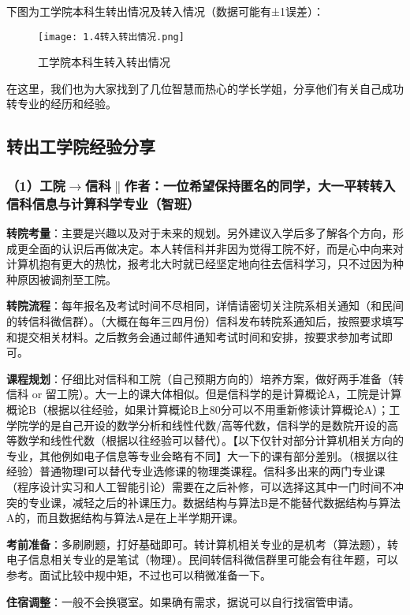\documentclass[11pt,oneside]{book}
\begin{document}
下图为工学院本科生转出情况及转入情况（数据可能有±1误差）：
\begin{figure}[htbp]
    \centering
    \texttt{[image: 1.4转入转出情况.png]}
    \renewcommand{\figurename}{图}
    \caption{工学院本科生转入转出情况}
    \label{fig:enter-label}
\end{figure}

在这里，我们也为大家找到了几位智慧而热心的学长学姐，分享他们有关自己成功转专业的经历和经验。

\subsection{转出工学院经验分享}
\subsubsection{（1）工院$\to$信科$\parallel$作者：一位希望保持匿名的同学，大一平转转入信科信息与计算科学专业（智班）}
\textbf{\textbf{转院考量}}：主要是兴趣以及对于未来的规划。另外建议入学后多了解各个方向，形成更全面的认识后再做决定。本人转信科并非因为觉得工院不好，而是心中向来对计算机抱有更大的热忱，报考北大时就已经坚定地向往去信科学习，只不过因为种种原因被调剂至工院。

\textbf{\textbf{转院流程}}：每年报名及考试时间不尽相同，详情请密切关注院系相关通知（和民间的转信科微信群）。（大概在每年三四月份）信科发布转院系通知后，按照要求填写和提交相关材料。之后教务会通过邮件通知考试时间和安排，按要求参加考试即可。

\textbf{\textbf{课程规划}}：仔细比对信科和工院（自己预期方向的）培养方案，做好两手准备（转信科 or 留工院）。大一上的课大体相似。但是信科学的是计算概论A，工院是计算概论B（根据以往经验，如果计算概论B上80分可以不用重新修读计算概论A）；工学院学的是自己开设的数学分析和线性代数/高等代数，信科学的是数院开设的高等数学和线性代数（根据以往经验可以替代）。【以下仅针对部分计算机相关方向的专业，其他例如电子信息等专业会略有不同】大一下的课有部分差别。（根据以往经验）普通物理Ⅰ可以替代专业选修课的物理类课程。信科多出来的两门专业课（程序设计实习和人工智能引论）需要在之后补修，可以选择这其中一门时间不冲突的专业课，减轻之后的补课压力。数据结构与算法B是不能替代数据结构与算法A的，而且数据结构与算法A是在上半学期开课。

\textbf{\textbf{考前准备}}：多刷刷题，打好基础即可。转计算机相关专业的是机考（算法题），转电子信息相关专业的是笔试（物理）。民间转信科微信群里可能会有往年题，可以参考。面试比较中规中矩，不过也可以稍微准备一下。

\textbf{\textbf{住宿调整}}：一般不会换寝室。如果确有需求，据说可以自行找宿管申请。
\end{document}
